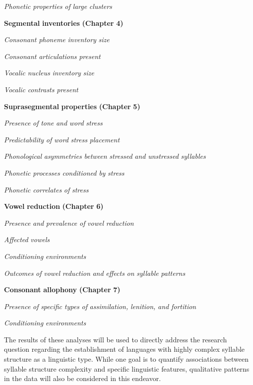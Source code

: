 \textit{Phonetic} \textit{properties} \textit{of} \textit{large} \textit{clusters}

\textbf{Segmental} \textbf{inventories} \textbf{(Chapter} \textbf{4)}

\textit{Consonant} \textit{phoneme} \textit{inventory} \textit{size}

\textit{Consonant} \textit{articulations} \textit{present}

\textit{Vocalic} \textit{nucleus} \textit{inventory} \textit{size}

\textit{Vocalic} \textit{contrasts} \textit{present}

\textbf{Suprasegmental} \textbf{properties} \textbf{(Chapter} \textbf{5)}

\textit{Presence} \textit{of} \textit{tone} \textit{and} \textit{word} \textit{stress}

\textit{Predictability} \textit{of} \textit{word} \textit{stress} \textit{placement}

\textit{Phonological} \textit{asymmetries} \textit{between} \textit{stressed} \textit{and} \textit{unstressed} \textit{syllables}

\textit{Phonetic} \textit{processes} \textit{conditioned} \textit{by} \textit{stress}

\textit{Phonetic} \textit{correlates} \textit{of} \textit{stress}

\textbf{Vowel} \textbf{reduction} \textbf{(Chapter} \textbf{6)}

\textit{Presence} \textit{and} \textit{prevalence} \textit{of} \textit{vowel} \textit{reduction}

\textit{Affected} \textit{vowels}

\textit{Conditioning} \textit{environments}

\textit{Outcomes} \textit{of} \textit{vowel} \textit{reduction} \textit{and} \textit{effects} \textit{on} \textit{syllable} \textit{patterns}

\textbf{Consonant} \textbf{allophony} \textbf{(Chapter} \textbf{7)}

\textit{Presence} \textit{of} \textit{specific} \textit{types} \textit{of} \textit{assimilation,} \textit{lenition,} \textit{and} \textit{fortition}

\textit{Conditioning} \textit{environments}
\z

  The results of these analyses will be used to directly address the research question regarding the establishment of languages with highly complex syllable structure as a linguistic type. While one goal is to quantify associations between syllable structure complexity and specific linguistic features, qualitative patterns in the data will also be considered in this endeavor.

